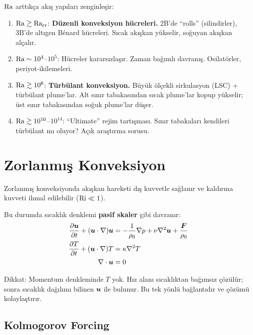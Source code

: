 $\mathrm{Ra}$ arttıkça akış yapıları zenginleşir:

\begin{enumerate}
    \item $\mathrm{Ra} \gtrsim \mathrm{Ra}_{\text{cr}}$: \textbf{Düzenli konveksiyon hücreleri.} 2B'de ``rolls'' (silindirler), 3B'de altıgen Bénard hücreleri. Sıcak akışkan yükselir, soğuyan akışkan alçalır.

    \item $\mathrm{Ra} \sim 10^4$--$10^5$: Hücreler kararsızlaşır. Zaman bağımlı davranış. Osilatörler, periyot-ikilemeleri.

    \item $\mathrm{Ra} \gtrsim 10^6$: \textbf{Türbülant konveksiyon.} Büyük ölçekli sirkulasyon (LSC) + türbülant plume'lar. Alt sınır tabakasından sıcak plume'lar kopup yükselir; üst sınır tabakasından soğuk plume'lar düşer.

    \item $\mathrm{Ra} \gtrsim 10^{10}$--$10^{14}$: ``Ultimate'' rejim tartışması. Sınır tabakaları kendileri türbülant mı oluyor? Açık araştırma sorusu.
\end{enumerate}


\section{Zorlanmış Konveksiyon}
\label{sec:forced_convection}

Zorlanmış konveksiyonda akışkan hareketi dış kuvvetle sağlanır ve kaldırma kuvveti ihmal edilebilir ($\mathrm{Ri} \ll 1$).

Bu durumda sıcaklık denklemi \textbf{pasif skaler} gibi davranır:
\begin{subequations}
\begin{align}
    \frac{\partial \bm{u}}{\partial t} + (\bm{u}\cdot\nabla)\bm{u} &= -\frac{1}{\rho_0}\nabla p + \nu\nabla^2\bm{u} + \frac{\bm{F}}{\rho_0} \\
    \frac{\partial T}{\partial t} + (\bm{u}\cdot\nabla)T &= \kappa\nabla^2 T \\
    \nabla \cdot\bm{u} &= 0
\end{align}
\end{subequations}

Dikkat: Momentum denkleminde $T$ yok. Hız alanı sıcaklıktan bağımsız çözülür; sonra sıcaklık dağılımı bilinen $\bm{u}$ ile bulunur. Bu tek yönlü bağlantıdır ve çözümü kolaylaştırır.

\subsection{Kolmogorov Forcing}

